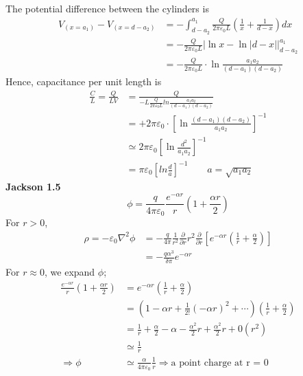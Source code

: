 \documentclass[letterpage]{article}
\begin{document}
The potential difference between the cylinders is
\begin{align*}
  V_{(x=a_1)} - V_{(x=d-a_2)} &= -\int_{d-a_2}^{a_1} 
  \frac{Q}{2 \pi \varepsilon_0 L} \left(\frac{1}{x} + \frac{1}{d-x}\right) dx\\
  &= - \frac{Q}{2 \pi \varepsilon_0 L} \left|\ln x -\ln |d-x|\right|_{d-a_2}^{a_1}\\
  &= -\frac{Q}{2\pi \varepsilon_0 L} \cdot \ln \frac{a_1 a_2}{(d-a_1)(d-a_2)}
\end{align*}
Hence, capacitance per unit length is
\begin{align*}
  \frac{C}{L} = \frac{Q}{LV} &= \frac{Q}{-L\frac{Q}{2\pi\varepsilon_0 L} 
  ln\frac{a_1 a_2}{(d-a_1)(d-a_2)}}\\
  &= + 2\pi\varepsilon_0 \cdot {\left[\ln \frac{(d-a_1)(d-a_2)}{a_1 a_2} 
  \right]}^{-1}\\
  &\simeq 2\pi \varepsilon_0 \left[\ln \frac{d^2}{a_1 a_2}\right]^{-1}\\
  &= \pi \varepsilon_0 \left[ln \frac{d}{a}\right]^{-1} 
  \qquad a=\sqrt{a_1 a_2}    
\end{align*}
\textbf{Jackson 1.5} 
\begin{equation*}
  \phi = \frac{q}{4\pi \varepsilon_0} \frac{e^{-\alpha r}}{r}
  \left(1+\frac{\alpha r}{2}\right)  
\end{equation*}
For $r>0$,
\begin{align*}
  \rho = -\varepsilon_0 \nabla^2 \phi &= -\frac{q}{4\pi} \frac{1}{r^2}
  \frac{\partial}{\partial r} r^2 \frac{\partial}{\partial r}
  \left[e^{-\alpha r}\left(\frac{1}{r}+\frac{\alpha}{2}\right)\right]\\
  &= - \frac{q\alpha^3}{\delta \pi} e^{-\alpha r}
\end{align*}
For $r \approx 0$, we expand $\phi$;
\begin{align*}
  \frac{e^{-\alpha r}}{r} \left(1 + \frac{\alpha r}{2}\right)
  &= e^{-\alpha r} \left(\frac{1}{r} + \frac{\alpha}{2}\right)\\
  &= \left(1-\alpha r + \frac{1}{2!}(-\alpha r)^2 + \cdots \right)
  \left(\frac{1}{r}+\frac{\alpha}{2}\right)\\
  &= \frac{1}{r}+\frac{\alpha}{2} - \alpha - \frac{\alpha^2}{2}r 
  + \frac{\alpha^2}{2}r + 0(r^2)\\
  &\simeq \frac{1}{r}\\
  \Rightarrow \phi &\simeq \frac{\alpha}{4\pi \varepsilon_0} \frac{1}{r}
  \Rightarrow \text{a point charge at r = 0}
\end{align*}
\end{document}
